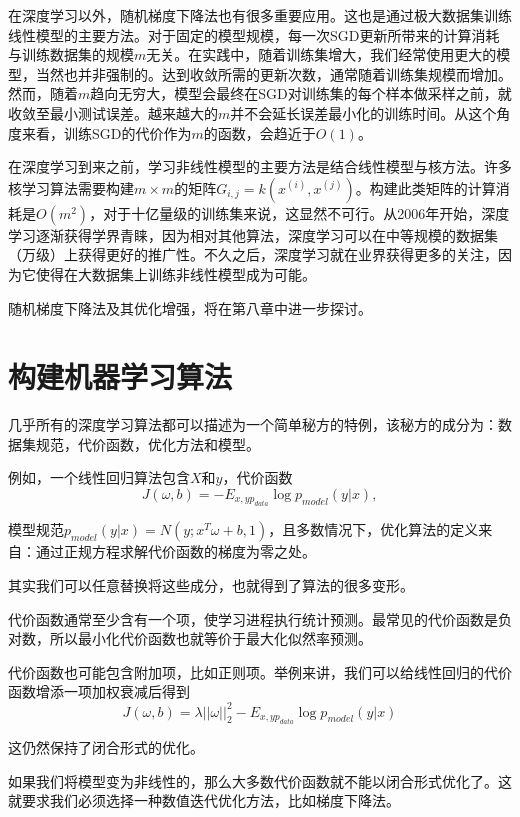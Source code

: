 在深度学习以外，随机梯度下降法也有很多重要应用。这也是通过极大数据集训练线性模型的主要方法。对于固定的模型规模，每一次SGD更新所带来的计算消耗与训练数据集的规模$m$无关。在实践中，随着训练集增大，我们经常使用更大的模型，当然也并非强制的。达到收敛所需的更新次数，通常随着训练集规模而增加。然而，随着$m$趋向无穷大，模型会最终在SGD对训练集的每个样本做采样之前，就收敛至最小测试误差。越来越大的$m$并不会延长误差最小化的训练时间。从这个角度来看，训练SGD的代价作为$m$的函数，会趋近于$O(1)$。

在深度学习到来之前，学习非线性模型的主要方法是结合线性模型与核方法。许多核学习算法需要构建$m \times m$的矩阵$G_{i,j}=k(x^{(i)}, x^{(j)})$。构建此类矩阵的计算消耗是$O(m^2)$，对于十亿量级的训练集来说，这显然不可行。从2006年开始，深度学习逐渐获得学界青睐，因为相对其他算法，深度学习可以在中等规模的数据集（万级）上获得更好的推广性。不久之后，深度学习就在业界获得更多的关注，因为它使得在大数据集上训练非线性模型成为可能。

随机梯度下降法及其优化增强，将在第八章中进一步探讨。

\section{构建机器学习算法}
\label{sec:5.10}


几乎所有的深度学习算法都可以描述为一个简单秘方的特例，该秘方的成分为：数据集规范，代价函数，优化方法和模型。

例如，一个线性回归算法包含$X$和$y$，代价函数
\begin{equation}
	 J(\omega , b) = -E_{x,y p_{data}} \log p_{model}(y|x),
    \label{form:5.92}
\end{equation}

模型规范$p_{model}(y|x)=N(y;x^T\omega+b,1)$，且多数情况下，优化算法的定义来自：通过正规方程求解代价函数的梯度为零之处。

其实我们可以任意替换将这些成分，也就得到了算法的很多变形。

代价函数通常至少含有一个项，使学习进程执行统计预测。最常见的代价函数是负对数，所以最小化代价函数也就等价于最大化似然率预测。

代价函数也可能包含附加项，比如正则项。举例来讲，我们可以给线性回归的代价函数增添一项加权衰减后得到
\begin{equation}
	J(\omega  ,b) = \lambda ||\omega||_2^2 - E_{x,y p_{data}} \log p_{model}(y|x)
	\label{form:5.93}
\end{equation}

这仍然保持了闭合形式的优化。

如果我们将模型变为非线性的，那么大多数代价函数就不能以闭合形式优化了。这就要求我们必须选择一种数值迭代优化方法，比如梯度下降法。

